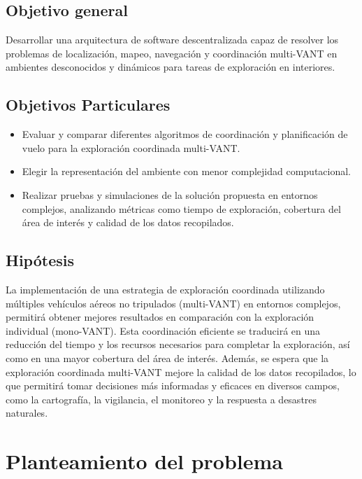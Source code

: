 \documentclass[sigconf]{acmart}
\begin{document}
\subsection*{Objetivo general}

Desarrollar una arquitectura de software descentralizada capaz de resolver los problemas de localización, mapeo, navegación y coordinación multi-VANT en ambientes desconocidos y dinámicos para tareas de exploración en interiores.

\subsection*{Objetivos Particulares}

\begin{itemize}
\item Evaluar y comparar diferentes algoritmos de coordinación y planiﬁcación de vuelo para la exploración coordinada multi-VANT.
\item Elegir la representación del ambiente con menor complejidad computacional.
\item Realizar pruebas y simulaciones de la solución propuesta en entornos complejos, analizando métricas como tiempo de exploración, cobertura del área de interés y calidad de los datos recopilados.
\end{itemize}

\subsection*{Hipótesis}

La implementación de una estrategia de exploración coordinada utilizando múltiples vehículos aéreos no tripulados (multi-VANT) en entornos complejos, permitirá obtener mejores resultados en comparación con la exploración individual (mono-VANT). Esta coordinación eﬁciente se traducirá en una reducción del tiempo y los recursos necesarios para completar la exploración, así como en una mayor cobertura del área de interés. Además, se espera que la exploración coordinada multi-VANT mejore la calidad de los datos recopilados, lo que permitirá tomar decisiones más informadas y eﬁcaces en diversos campos, como la cartografía, la vigilancia, el monitoreo y la respuesta a desastres naturales.

\section{Planteamiento del problema}
\end{document}
